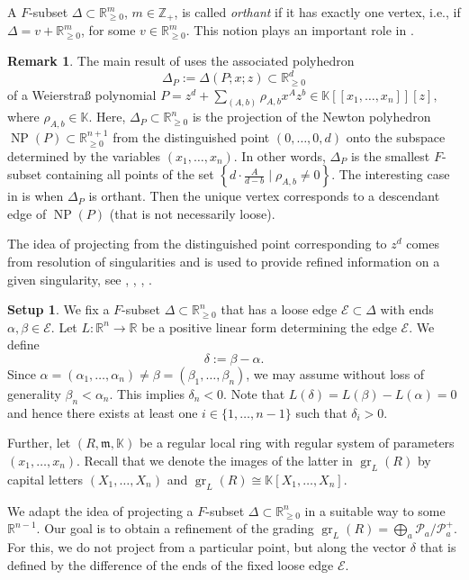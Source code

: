 \documentclass[11pt]{amsart}
\theoremstyle{plain}
\theoremstyle{definition}
\newtheorem{Rk}[Thm]{Remark}
\newtheorem{Setup}[Thm]{Setup}
\numberwithin{equation}{section}
\newcommand{\gr}{\operatorname{gr}}
\newcommand{\NP}{\operatorname{NP}}
\renewcommand{\a}{\alpha}
\renewcommand{\b}{\beta}
\renewcommand{\d}{\delta}
\renewcommand{\r}{\rho}
\newcommand{\D}{\Delta}
\newcommand{\KK}{{\mathbb K}}
\newcommand{\RR}{\mathbb R}
\newcommand{\ZZ}{{\mathbb Z}}
\newcommand{\cE}{\mathcal{E}}
\newcommand{\cP}{\mathcal P}
\newcommand{\Edge}{\cE}
\newcommand{\fm}{\mathfrak m}
\newcommand{\gqz}{{\geq 0}}
\renewcommand{\(}{(\!(}
\renewcommand{\)}{)\!)}
\begin{document}
A $ F $-subset $ \D \subset \RR^m_\gqz $, $ m \in \ZZ_+ $, is called {\em orthant} if it has exactly one vertex, 
i.e., if $ \D = v + \RR^m_\gqz $, for some $ v \in \RR^m_\gqz  $.
This notion plays an important role in \cite{RS}.

\begin{Rk}
	The main result of \cite{RS} uses the associated polyhedron  
	\[ 
	\D_P := \D(P;x;z) \subset \RR^d_\gqz 
	\]
	of a Weierstra{\ss} polynomial 
	$ 
	P = z^d + \sum_{(A,b)} \r_{A,b} x^A z^b \in \KK[[x_1, \ldots, x_n]][z],
	$ 
	where $ \r_{A,b} \in \KK $.
	Here, $ \D_P \subset \RR^n_\gqz $ is the projection of the Newton polyhedron $ \NP(P) \subset \RR^{n+1}_\gqz $ from the distinguished point $ (0, \ldots, 0, d) $ onto the subspace determined by the variables $ (x_1, \ldots, x_n) $.
	In other words, $ \D_P $ is the smallest $ F $-subset containing all points of the set
	$
	\left\{ d \cdot \frac{A}{d-b} \mid \r_{A,b} \neq 0 
	\right\}. 
	$
	The interesting case in \cite{RS} is when $ \D_P $ is orthant.
	Then the unique vertex corresponds to a descendant edge of $ \NP(P) $
	(that is not necessarily loose).
	
	The idea of projecting from the distinguished point  corresponding to $ z^d $ comes from resolution of singularities and is used to provide refined information on a given singularity, see \cite{HiroCharPoly}, \cite{CPmixed2}, \cite{CSdim2}, \cite{BerndThesis}.
\end{Rk} 


\begin{Setup} 
	\label{Setup} 
We fix a $ F $-subset $ \D \subset \RR^n_\gqz  $ that has a loose edge $ \Edge \subset \D $ with ends $ \a, \b \in \Edge $. 
Let $ L : \RR^n \to \RR $ be a positive linear form determining the edge $ \Edge $. 
We define
\[
	\d := \b - \a.
\]
Since $ \a = (\a_1, \ldots, \a_n ) \neq \b = (\b_1, \ldots, \b_n) $, we may assume without loss of generality 
$
\b_n < \a_n.
$
This implies $ \d_n < 0 $.
Note that $ L (\d) = L(\b) - L(\a) = 0 $ and hence there exists at least one $ i \in \{ 1, \ldots, n-1 \} $ such that $ \d_i > 0 $.

Further, let $ (R ,\fm , \KK ) $ be a regular local ring with regular system of parameters $ (x_1, \ldots, x_n) $.
Recall that we denote the images of the latter in $ \gr_L(R) $ by capital letters $ (X_1, \ldots, X_n) $
and $ \gr_L(R) \cong \KK[X_1, \ldots, X_n] $.
\end{Setup} 

We adapt the idea of projecting a $ F $-subset $ \D \subset \RR_\gqz^{n} $  in a suitable way to some $ \RR^{n-1}  $.
Our goal is to obtain a refinement of the grading
$
	 \gr_L(R) = \bigoplus_{a} \cP_a / \cP_a^+.
$
For this, we do not project from a particular point, but along the vector $ \delta $ that is defined by the difference of the ends of the fixed loose edge $ \Edge $.
\end{document}
